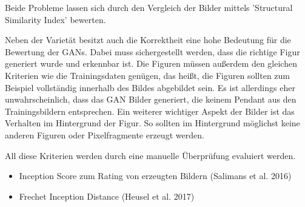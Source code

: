 Beide Probleme lassen sich durch den Vergleich der Bilder mittels 'Structural Similarity Index' \cite{structural-similarity-index} bewerten.

Neben der Varietät besitzt auch die Korrektheit eine hohe Bedeutung für die Bewertung der GANs.
Dabei muss sichergestellt werden, dass die richtige Figur generiert wurde und erkennbar ist.
Die Figuren müssen außerdem den gleichen Kriterien wie die Trainingsdaten genügen, das heißt, die Figuren sollten zum Beispiel vollständig innerhalb des Bildes abgebildet sein.
Es ist allerdings eher unwahrscheinlich, dass das GAN Bilder generiert, die keinem Pendant aus den Trainingsbildern entsprechen.
Ein weiterer wichtiger Aspekt der Bilder ist das Verhalten im Hintergrund der Figur.
So sollten im Hintergrund möglichst keine anderen Figuren oder Pixelfragmente erzeugt werden.

All diese Kriterien werden durch eine manuelle Überprüfung evaluiert werden.

\begin{itemize}
	\item Inception Score zum Rating von erzeugten Bildern (Salimans et al. 2016)
	\item Frechet Inception Distance (Heusel et al. 2017)
\end{itemize}

